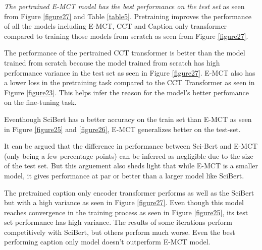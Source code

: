\textit{The pertrained E-MCT model has the best performance on the test set} as seen from Figure \ref{figure27} and Table \ref{table5}. Pretraining improves the performance of all the models including E-MCT, CCT and Caption only transformer compared to training those models from scratch as seen from Figure \ref{figure27}. 

The performance of the pertrained CCT transformer is better than the model trained from scratch because the model trained from scratch has high performance variance in the test set as seen in Figure \ref{figure27}. E-MCT also has a lower loss in the pretraining task compared to the CCT Transformer as seen in Figure \ref{figure23}. This helps infer the reason for the model's better perfomance on the fine-tuning task. 

Eventhough SciBert has a better accuracy on the train set than E-MCT as seen in Figure \ref{figure25} and \ref{figure26}, E-MCT generalizes better on the test-set.

It can be argued that the difference in performance between Sci-Bert and E-MCT (only being a few percentage points) can be inferred as negligible due to the size of the test set. But this arguement also sheds light that while E-MCT is a  smaller model, it gives performance at par or better than a larger model like SciBert. 

The pretrained caption only encoder transformer performs as well as the SciBert but with a high variance as seen in Figure \ref{figure27}. Even though this model reaches convergence in the training process as seen in Figure \ref{figure25}, its test set performance has high variance. The results of some iterations perform competitively with SciBert, but others perform much worse. Even the best performing caption only model doesn't outperform E-MCT model. 